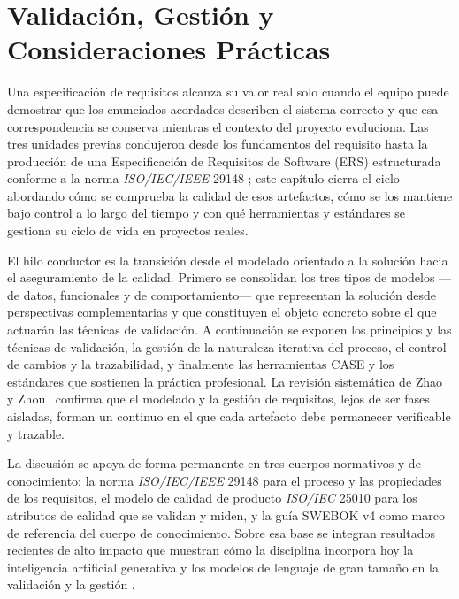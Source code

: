 \documentclass[11pt,a4paper,oneside]{report}
\begin{document}
	\setcounter{chapter}{3}
	\sffamily\normalfont
	
	\chapter{Validaci\'on, Gesti\'on y Consideraciones Pr\'acticas}
	
	Una especificaci\'on de requisitos alcanza su valor real solo cuando el equipo puede demostrar que los enunciados acordados describen el sistema correcto y que esa correspondencia se conserva mientras el contexto del proyecto evoluciona. Las tres unidades previas condujeron desde los fundamentos del requisito hasta la producci\'on de una Especificaci\'on de Requisitos de Software (ERS) estructurada conforme a la norma \textit{ISO/IEC/IEEE} 29148 \citep{iso29148_2018}; este cap\'itulo cierra el ciclo abordando c\'omo se comprueba la calidad de esos artefactos, c\'omo se los mantiene bajo control a lo largo del tiempo y con qu\'e herramientas y est\'andares se gestiona su ciclo de vida en proyectos reales.
	
	El hilo conductor es la transici\'on desde el modelado orientado a la soluci\'on hacia el aseguramiento de la calidad. Primero se consolidan los tres tipos de modelos ---de datos, funcionales y de comportamiento--- que representan la soluci\'on desde perspectivas complementarias y que constituyen el objeto concreto sobre el que actuar\'an las t\'ecnicas de validaci\'on. A continuaci\'on se exponen los principios y las t\'ecnicas de validaci\'on, la gesti\'on de la naturaleza iterativa del proceso, el control de cambios y la trazabilidad, y finalmente las herramientas CASE y los est\'andares que sostienen la pr\'actica profesional. La revisi\'on sistem\'atica de Zhao y Zhou~\citep{zhao_mbre_2026} confirma que el modelado y la gesti\'on de requisitos, lejos de ser fases aisladas, forman un continuo en el que cada artefacto debe permanecer verificable y trazable.
	
	La discusi\'on se apoya de forma permanente en tres cuerpos normativos y de conocimiento: la norma \textit{ISO/IEC/IEEE} 29148 para el proceso y las propiedades de los requisitos, el modelo de calidad de producto \textit{ISO/IEC} 25010 \citep{iso25010_2023} para los atributos de calidad que se validan y miden, y la gu\'ia SWEBOK v4 \citep{swebok_v4_2024} como marco de referencia del cuerpo de conocimiento. Sobre esa base se integran resultados recientes de alto impacto que muestran c\'omo la disciplina incorpora hoy la inteligencia artificial generativa y los modelos de lenguaje de gran tama\~no en la validaci\'on y la gesti\'on \citep{cheng_genai_re_2026,stein_llm_re_2026}.
	
\end{document}
